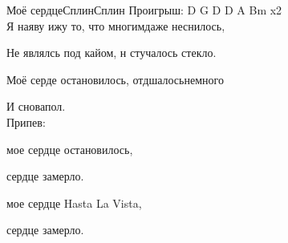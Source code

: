 \documentclass[11pt,a5paper]{book}
\renewcommand{\tt}{\indent \indent}
\begin{document}
\begin{song}{Моё сердце}{}{Сплин}{Сплин}{}{}
Проигрыш: D G D D A Bm x2\\

Я наяву ижу то, что многимдаже неснилось,\par 
Не являлсь под кайом, н стучалось  стекло.\par
Моё серде остановилось, отдшалосьнемного\par
И сновапол. \\

Припев:\par
{} мое сердце остановилось,\par
{} сердце замерло.\par
{} мое сердце Hasta La Vista,\par
{} сердце замерло.\\

\begin{SBSection*}
\begin{figure}[b!]
\end{figure}
\end{SBSection*}
\end{song}
\end{document}
